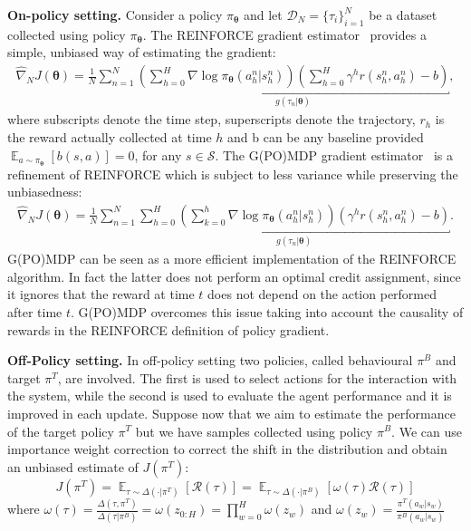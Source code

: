 \documentclass{article}
\theoremstyle{remark}
\theoremstyle{definition}
\newcommand{\todopir}[1]{\todo[color=blued, inline]{\small #1}}
\DeclareMathOperator*{\EV}{\mathbb{E}}
\newcommand{\EVV}[2][\ppvect \in \ppspace]{\EV_{#1}\left[{#2}\right]}
\newcommand{\vtheta}{\boldsymbol{\theta}}
\newcommand{\Sspace}{\mathcal{S}}
\newcommand{\pol}{\pi_{\vtheta}}
\newcommand{\score}[2]{\nabla\log\pi_{#1}(#2)}
\newcommand{\gradApp}[2]{\widehat{\nabla}_{#2}J(#1)}
\begin{document}
\textbf{On-policy setting.}
Consider a policy $\pol$ and let $\mathcal{D}_N = \{\tau_i\}_{i=1}^N$ be a dataset collected using policy $\pol$.
The REINFORCE gradient estimator~\citep{williams1992simple} provides a simple, unbiased way of estimating the gradient:
\begin{align*}
\gradApp{\vtheta}{N} = \frac{1}{N}\sum_{n=1}^{N}
\underbracket{
\left(\sum_{h=0}^{H}\score{\vtheta}{a_h^n\vert s_h^n}\right)\left(\sum_{h=0}^{H}\gamma^h r(s_h^n,a_h^n) - b\right)
}_{g(\tau_n|\vtheta)}
,
\end{align*}
where subscripts denote the time step, superscripts denote the trajectory, $r_h$ is the reward actually collected at time $h$ and b can be any baseline provided $\EVV[a \sim \pol]{b(s,a)} = 0$, for any $s\in\Sspace$.\todopir{check definition of baseline}
The G(PO)MDP gradient estimator~\cite{baxter2001infinite} is a refinement of REINFORCE which is subject to less variance \cite{zhao2011analysis} while preserving the unbiasedness:
\begin{align*}
\gradApp{\vtheta}{N} = \frac{1}{N}\sum_{n=1}^{N}
\underbracket{
\sum_{h=0}^{H}\left(\sum_{k=0}^{h}\score{\vtheta}{a_h^n\vert s_h^n}\right)\left(\gamma^h r(s_h^n,a_h^n) - b\right)
}_{g(\tau_n|\vtheta)}.
\end{align*}
G(PO)MDP can be seen as a more efficient implementation
of the REINFORCE algorithm. In fact the latter does not perform
an optimal credit assignment, since it ignores that the reward at time $t$ does
not depend on the action performed after time $t$. G(PO)MDP overcomes this
issue taking into account the causality of rewards in the REINFORCE definition
of policy gradient.

\textbf{Off-Policy setting.}
In off-policy setting two policies, called behavioural $\pi^B$ and target $\pi^T$, are involved.
The first is used to select actions for the interaction with the system, while the second is used to evaluate the agent performance and it is improved in each update.
Suppose now that we aim to estimate the performance of the target policy $\pi^T$ but we have samples collected using policy $\pi^B$.
We can use importance weight correction to correct the shift in the distribution and obtain an unbiased estimate of $J(\pi^T)$:
\[
        J(\pi^T) = \EVV[\tau \sim \Delta(\cdot|\pi^T)]{\mathcal{R}(\tau)} = \EVV[\tau \sim \Delta(\cdot|\pi^B)]{\omega(\tau) \mathcal{R}(\tau)}
\]
where $\omega(\tau) = \frac{\Delta(\tau,\pi^T)}{\Delta(\tau|\pi^B)} = \omega(z_{0:H}) = \prod_{w=0}^{H} \omega(z_w)$ and $\omega(z_w) = \frac{\pi^T(a_w|s_w)}{\pi^B(a_w|s_w)}$
\end{document}
